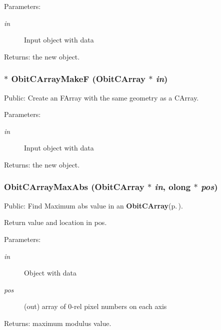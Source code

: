 \begin{Desc}
\item[Parameters:]
\begin{description}
\item[{\em in}]Input object with data \end{description}
\end{Desc}
\begin{Desc}
\item[Returns:]the new object. \end{Desc}
\subsubsection{$\ast$ Obit\-CArray\-Make\-F ({\bf Obit\-CArray} $\ast$ {\em in})}\label{ObitCArray_8h_a56}


Public: Create an FArray with the same geometry as a CArray. 

\begin{Desc}
\item[Parameters:]
\begin{description}
\item[{\em in}]Input object with data \end{description}
\end{Desc}
\begin{Desc}
\item[Returns:]the new object. \end{Desc}
\subsubsection{ Obit\-CArray\-Max\-Abs ({\bf Obit\-CArray} $\ast$ {\em in}, {\bf olong} $\ast$ {\em pos})}\label{ObitCArray_8h_a43}


Public: Find Maximum abs value in an {\bf Obit\-CArray}{\rm (p.\,\pageref{structObitCArray})}. 

Return value and location in pos. \begin{Desc}
\item[Parameters:]
\begin{description}
\item[{\em in}]Object with data \item[{\em pos}](out) array of 0-rel pixel numbers on each axis \end{description}
\end{Desc}
\begin{Desc}
\item[Returns:]maximum modulus value. \end{Desc}
